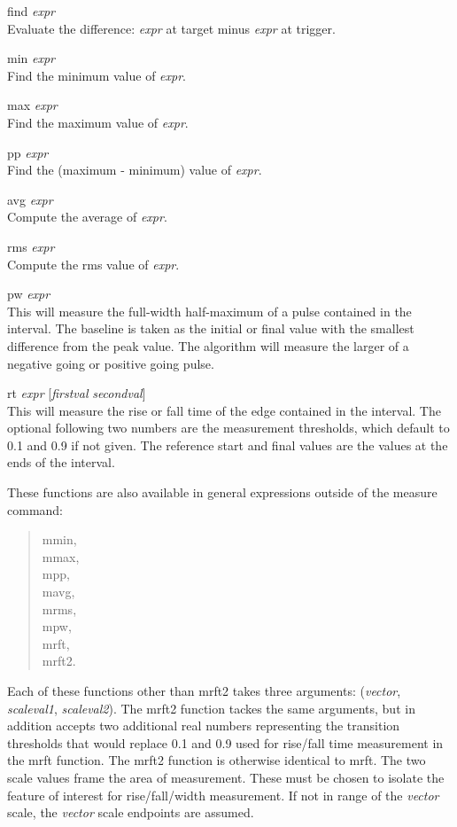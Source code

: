 \begin{description}
\item{{\vt find} {\it expr}}\\
Evaluate the difference:  {\it expr} at target minus {\it expr} at
trigger.
\item{{\vt min} {\it expr}}\\
Find the minimum value of {\it expr\/}.
\item{{\vt max} {\it expr}}\\
Find the maximum value of {\it expr\/}.
\item{{\vt pp} {\it expr}}\\
Find the (maximum - minimum) value of {\it expr\/}.
\item{{\vt avg} {\it expr}}\\
Compute the average of {\it expr\/}.
\item{{\vt rms} {\it expr}}\\
Compute the rms value of {\it expr\/}.
\item{{\vt pw} {\it expr}}\\
This will measure the full-width half-maximum of a pulse contained in
the interval.  The baseline is taken as the initial or final value
with the smallest difference from the peak value.  The algorithm will
measure the larger of a negative going or positive going pulse.
\item{{\vt rt} {\it expr} [{\it firstval} {\it secondval\/}]}\\
This will measure the rise or fall time of the edge contained in the
interval.  The optional following two numbers are the measurement
thresholds, which default to 0.1 and 0.9 if not given.  The reference
start and final values are the values at the ends of the interval.
\end{description}

These functions are also available in general expressions outside of
the {\cb measure} command:
\begin{quote}
 {\cb mmin},\\
 {\cb mmax},\\
 {\cb mpp},\\
 {\cb mavg},\\
 {\cb mrms},\\
 {\cb mpw},\\
 {\cb mrft},\\
 {\cb mrft2}.
\end{quote}

Each of these functions other than {\cb mrft2} takes three arguments: 
({\it vector\/}, {\it scaleval1\/}, {\it scaleval2\/}).  The {\cb
mrft2} function tackes the same arguments, but in addition accepts two
additional real numbers representing the transition thresholds that
would replace 0.1 and 0.9 used for rise/fall time measurement in the
{\cb mrft} function.  The {\cb mrft2} function is otherwise identical
to {\cb mrft}.  The two scale values frame the area of measurement. 
These must be chosen to isolate the feature of interest for
rise/fall/width measurement.  If not in range of the {\it vector}
scale, the {\it vector} scale endpoints are assumed.

